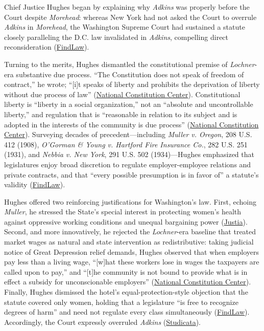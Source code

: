 \documentclass[12pt]{article}
\begin{document}
Chief Justice Hughes began by explaining why \textit{Adkins} was properly before the Court despite \textit{Morehead}: whereas New York had not asked the Court to overrule \textit{Adkins} in \textit{Morehead}, the Washington Supreme Court had sustained a statute closely paralleling the D.C. law invalidated in \textit{Adkins}, compelling direct reconsideration (\href{https://caselaw.findlaw.com/court/us-supreme-court/300/379.html}{FindLaw}).

Turning to the merits, Hughes dismantled the constitutional premise of \textit{Lochner}-era substantive due process. ``The Constitution does not speak of freedom of contract,'' he wrote; ``[i]t speaks of liberty and prohibits the deprivation of liberty without due process of law'' (\href{https://constitutioncenter.org/the-constitution/supreme-court-case-library/west-coast-hotel-co-v-parrish}{National Constitution Center}). Constitutional liberty is ``liberty in a social organization,'' not an ``absolute and uncontrollable liberty,'' and regulation that is ``reasonable in relation to its subject and is adopted in the interests of the community is due process'' (\href{https://constitutioncenter.org/the-constitution/supreme-court-case-library/west-coast-hotel-co-v-parrish}{National Constitution Center}). Surveying decades of precedent---including \textit{Muller v. Oregon}, 208 U.S. 412 (1908), \textit{O'Gorman \& Young v. Hartford Fire Insurance Co.}, 282 U.S. 251 (1931), and \textit{Nebbia v. New York}, 291 U.S. 502 (1934)---Hughes emphasized that legislatures enjoy broad discretion to regulate employer-employee relations and private contracts, and that ``every possible presumption is in favor of'' a statute's validity (\href{https://caselaw.findlaw.com/court/us-supreme-court/300/379.html}{FindLaw}).

Hughes offered two reinforcing justifications for Washington's law. First, echoing \textit{Muller}, he stressed the State's special interest in protecting women's health against oppressive working conditions and unequal bargaining power (\href{https://supreme.justia.com/cases/federal/us/300/379/}{Justia}). Second, and more innovatively, he rejected the \textit{Lochner}-era baseline that treated market wages as natural and state intervention as redistributive: taking judicial notice of Great Depression relief demands, Hughes observed that when employers pay less than a living wage, ``[w]hat these workers lose in wages the taxpayers are called upon to pay,'' and ``[t]he community is not bound to provide what is in effect a subsidy for unconscionable employers'' (\href{https://constitutioncenter.org/the-constitution/supreme-court-case-library/west-coast-hotel-co-v-parrish}{National Constitution Center}). Finally, Hughes dismissed the hotel's equal-protection-style objection that the statute covered only women, holding that a legislature ``is free to recognize degrees of harm'' and need not regulate every class simultaneously (\href{https://caselaw.findlaw.com/court/us-supreme-court/300/379.html}{FindLaw}). Accordingly, the Court expressly overruled \textit{Adkins} (\href{https://www.studicata.com/case-briefs/case/west-coast-hotel-co-v-parrish}{Studicata}).
\end{document}
